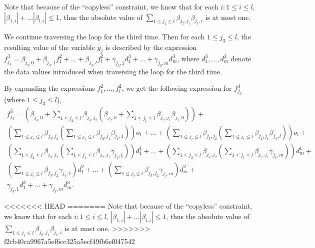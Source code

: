 Note that because of the ``copyless'' constraint, we know that for each $i: 1 \le i \le l$, $|\beta_{1,i}|+ \dots |\beta_{l,i}| \le 1$, thus the absolute value of $\sum \limits_{1 \le j_1 \le l} \beta_{j_2,j_1} \beta_{j_1, i}$ is at most one. 

We continue traversing the loop for the third time. Then for each $1 \le j_3 \le l$,  the resulting value of the variable $y_{j}$ is described by the expression $f^3_{j_3} = \beta_{j_3,0} + \beta_{j_3,1} f^2_1 + \dots + \beta_{j_3,l} f^2_l + \gamma_{j_3,1} d^3_1 + \dots + \gamma_{j_3,m} d^3_m$, where $d^3_1, \dots, d^3_m$ denote the data values introduced when traversing the loop for the third time. 

By expanding the expressions $f^2_1,\dots,f^2_l$, we get the following expression for $f^3_{j_3}$ (where $1\le j_3 \le l$),
\[
\begin{array}{l}
f^3_{j_3} = (\beta_{j_3,0} + \sum \limits_{1 \le j_2 \le l} \beta_{j_3,j_2} (\beta_{j_2,0} + \sum \limits_{1 \le j_1 \le l} \beta_{j_2,j_1} \beta_{j_1, 0})) +\\
%
 (\sum \limits_{1 \le j_2 \le l}\beta_{j_3,j_2}(\sum \limits_{1 \le j_1 \le l}\beta_{j_2,j_1}\beta_{j_1,1})) o_1 + \dots + (\sum \limits_{1 \le j_2 \le l}\beta_{j_3,j_2}(\sum \limits_{1 \le j_1 \le l}\beta_{j_2,j_1}\beta_{j_1,l})) o_l +  \\
(\sum \limits_{1 \le j_2 \le l}\beta_{j_3, j_2}(\sum \limits_{1 \le j_1 \le l}\beta_{j_2,j_1}\gamma_{j_1,1})) d^1_1 +\dots + (\sum \limits_{1 \le j_2 \le l}\beta_{j_3,j_2}(\sum \limits_{1 \le j_1 \le l}\beta_{j_2,j_1}\gamma_{j_1,m})) d^1_m  + \\
(\sum \limits_{1 \le j_2 \le l}\beta_{j_3,j_2}\gamma_{j_2,1}) d^2_1 +\dots + (\sum \limits_{1 \le j_2 \le l}\beta_{j_3,j_2}\gamma_{j_2,m}) d^2_m  + \\
\gamma_{j_3,1} d^3_1 + \dots + \gamma_{j_3,m} d^3_m.
\end{array}
\]

<<<<<<< HEAD
=======
Note that because of the ``copyless'' constraint, we know that for each $i: 1 \le i \le l$, $|\beta_{1,i}|+ \dots |\beta_{l,i}| \le 1$, thus the absolute value of $\sum \limits_{1 \le j_1 \le l} \beta_{j_2,j_1} \beta_{j_1, i}$ is at most one. 
>>>>>>> f2cb40ca9967a5ef6cc325a5ecf49fb6ef047542
















